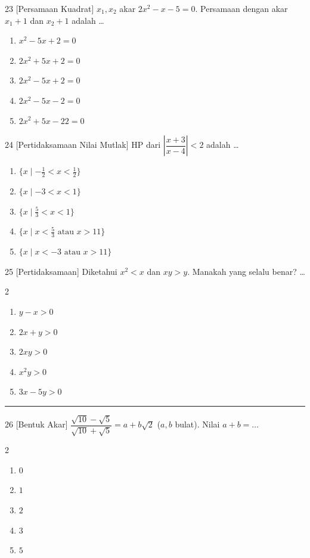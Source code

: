 \documentclass[11pt]{article}
\newenvironment{pil}{%
  \begin{enumerate}[label=(\alph*),leftmargin=*,itemsep=1pt,topsep=3pt]}%
  {\end{enumerate}}
\newenvironment{pilB}{%
  \par\smallskip\begin{multicols}{2}
  \begin{enumerate}[label=(\alph*),leftmargin=*,itemsep=1pt,topsep=3pt]}%
  {\end{enumerate}\end{multicols}}
\begin{document}
\begin{soal}{23 \normalfont\small[Persamaan Kuadrat]}
$x_1,x_2$ akar $2x^2-x-5=0$. Persamaan dengan akar $x_1+1$ dan $x_2+1$ adalah \ldots
\begin{pil}
  \item $x^2-5x+2=0$ \item $2x^2+5x+2=0$
  \item $2x^2-5x+2=0$ \item $2x^2-5x-2=0$ \item $2x^2+5x-22=0$
\end{pil}
\end{soal}

\begin{soal}{24 \normalfont\small[Pertidaksamaan Nilai Mutlak]}
HP dari $\left|\dfrac{x+3}{x-4}\right|<2$ adalah \ldots
\begin{pil}
  \item $\{x\mid-\tfrac12<x<\tfrac12\}$ \item $\{x\mid-3<x<1\}$
  \item $\{x\mid\tfrac53<x<1\}$ \item $\{x\mid x<\tfrac53\text{ atau }x>11\}$
  \item $\{x\mid x<-3\text{ atau }x>11\}$
\end{pil}
\end{soal}

\begin{soal}{25 \normalfont\small[Pertidaksamaan]}
Diketahui $x^2<x$ dan $xy>y$. Manakah yang selalu benar? \ldots
\begin{pilB}
  \item $y-x>0$ \item $2x+y>0$ \item $2xy>0$ \item $x^2y>0$ \item $3x-5y>0$
\end{pilB}
\end{soal}


\smallskip\hrule\medskip

\begin{soal}{26 \normalfont\small[Bentuk Akar]}
$\dfrac{\sqrt{10}-\sqrt5}{\sqrt{10}+\sqrt5}=a+b\sqrt2$ ($a,b$ bulat). Nilai $a+b=\ldots$
\begin{pilB}
  \item $0$ \item $1$ \item $2$ \item $3$ \item $5$
\end{pilB}
\end{soal}
\end{document}
